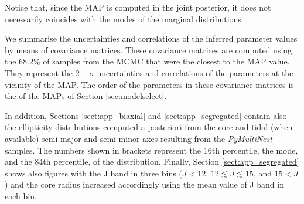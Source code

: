  Notice that, since the MAP is computed in the joint posterior, it does not necessarily coincides with the modes of the
marginal distributions. 

We summarise the uncertainties and correlations of the inferred parameter values by means of covariance matrices. These covariance matrices
are computed using the 68.2\% of samples from the MCMC that were the closest to the MAP value. They represent the $2-\sigma$ uncertainties
and correlations of the parameters at the vicinity of the MAP. The order of the parameters in these covariance matrices is the of the MAPs of Section  \ref{sec:modelselect}.

In addition, Sections \ref{sect:app_biaxial} and \ref{sect:app_segregated} contain also the ellipticity distributions computed a posteriori from the core and tidal (when available) semi-major and semi-minor axes resulting from the \emph{PyMultiNest} samples. The numbers shown in brackets represent the 16th percentile, the mode, and the 84th percentile, of the distribution. Finally, Section \ref{sect:app_segregated} shows also figures with the J band in three bins ($J < 12$, $12 \lesssim J \lesssim 15$, and $15 < J$) and the core radius increased accordingly using the mean value of J band in each bin.

